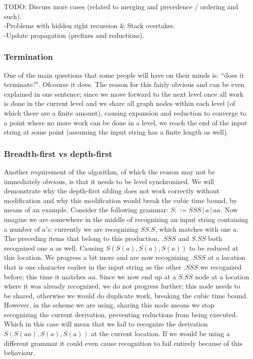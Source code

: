 \documentclass[a4paper,10pt]{article}
\begin{document}
TODO: Discuss more cases (related to merging and precedence / ordering and such).\\
-Problems with hidden right recursion \& Stack overtakes.\\
-Update propagation (prefixes and reductions).

\subsubsection{Termination}
One of the main questions that some people will have on their minds is: ``does it terminate?". Ofcourse it does. The reason for this fairly obvious and can be even explained in one sentence; since we move forward to the next level once all work is done in the current level and we share all graph nodes within each level (of which there are a finite amount), causing expansion and reduction to converge to a point where no more work can be done in a level, we reach the end of the input string at some point (assuming the input string has a finite length as well).

\subsubsection{Breadth-first vs depth-first}
\label{subsec:breadthFirstVsDepthFirst}
Another requirement of the algorithm, of which the reason may not be immediately obvious, is that it needs to be level synchronized. We will demonstrate why the depth-first sibling does not work correctly without modification and why this modification would break the cubic time bound, by means of an example. Consider the following grammar: $S ::= SSS\,|\,a\,|\,aa$. Now imagine we are somewhere in the middle of recognizing an input string containing a number of $a$'s; currently we are recognizing $SS.S$, which matches with one $a$. The preceding items that belong to this production, $.SSS$ and $S.SS$ both recognized one $a$ as well. Causing $S(S(a),S(a),S(a))$ to be reduced at this location. We progress a bit more and are now recognizing $.SSS$ at a location that is one character earlier in the input string as the other $.SSS$ we recognized before; this time it matches $aa$. Since we now end up at a $S.SS$ node at a location where it was already recognized, we do not progress further; this node needs to be shared, otherwise we would do duplicate work, breaking the cubic time bound. However, in the scheme we are using, sharing this node means we stop recognizing the current derivation, preventing reductions from being executed. Which in this case will mean that we fail to recognize the derivation $S(S(aa),S(a),S(a))$ at the current location. If we would be using a different grammar it could even cause recognition to fail entirely because of this behaviour.
\end{document}
